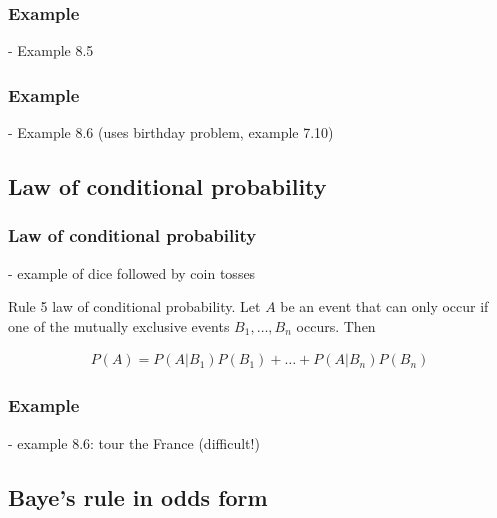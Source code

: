 \begin{frame}
    \frametitle{Example}

- Example 8.5

\end{frame}

\begin{frame}
    \frametitle{Example}

- Example 8.6 (uses birthday problem, example 7.10)

\end{frame}

\subsection{Law of conditional probability}

\begin{frame}
    \frametitle{Law of conditional probability}

- example of dice followed by coin tosses

    \begin{description}

        \item{Rule 5} law of conditional probability. Let $A$ be an event that
            can only occur if one of the mutually exclusive events
            $B_1,\ldots,B_n$ occurs. Then

            \begin{align*}
                P(A) = P(A|B_1) P(B_1) + \ldots + P(A|B_n) P(B_n)  
            \end{align*}

    \end{description}

\end{frame}

\begin{frame}
    \frametitle{Example}

- example 8.6: tour the France (difficult!)

\end{frame}

\subsection{Baye's rule in odds form}

